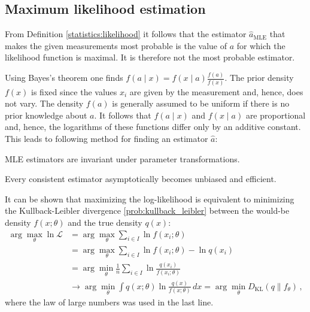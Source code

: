 \subsection{Maximum likelihood estimation}

    From Definition \ref{statistics:likelihood} it follows that the estimator $\hat{a}_\mathrm{MLE}$ that makes the given measurements most probable is the value of $a$ for which the likelihood function is maximal. It is therefore not the most probable estimator.

    Using Bayes's theorem one finds $f(a\mid x) = f(x\mid a)\frac{f(a)}{f(x)}$. The prior density $f(x)$ is fixed since the values $x_i$ are given by the measurement and, hence, does not vary. The density $f(a)$ is generally assumed to be uniform if there is no prior knowledge about $a$. It follows that $f(a\mid x)$ and $f(x\mid a)$ are proportional and, hence, the logarithms of these functions differ only by an additive constant. This leads to following method for finding an estimator $\hat{a}$:
    \begin{property}
        MLE estimators are invariant under parameter transformations.
    \end{property}

    \begin{property}
        Every consistent estimator asymptotically becomes unbiased and efficient.
    \end{property}

    \begin{property}\label{statistics:minimizing_KL}
        It can be shown that maximizing the log-likelihood is equivalent to minimizing the Kullback-Leibler divergence \ref{prob:kullback_leibler} between the would-be density $f(x;\theta)$ and the true density $q(x)$:
        \begin{align*}
            \arg\max_\theta\ln\mathcal{L} &= \arg\max_\theta\sum_{i\in I}\ln f(x_i;\theta)\\
            &= \arg\max_\theta\sum_{i\in I}\ln f(x_i;\theta) - \ln q(x_i)\\
            &= \arg\min_\theta\frac{1}{n}\sum_{i\in I}\ln\frac{q(x_i)}{f(x_i;\theta)}\\
            &\longrightarrow\arg\min_\theta\int q(x;\theta)\ln\frac{q(x)}{f(x;\theta)}\,dx = \arg\min_\theta D_\mathrm{KL}(q\|f_\theta)\,,
        \end{align*}
        where the law of large numbers was used in the last line.
    \end{property}

